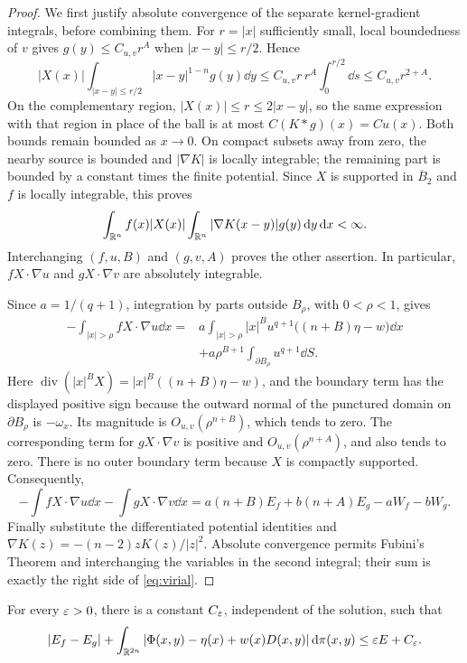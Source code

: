 \begin{proof}
We first justify absolute convergence of the separate kernel-gradient
integrals, before combining them. For \(r=|x|\) sufficiently small,
local boundedness of \(v\) gives
\(g(y)\le C_{u,v}r^A\) when \(|x-y|\le r/2\). Hence
\[
  |X(x)|\int_{|x-y|\le r/2}|x-y|^{1-n}g(y)\dd y
       \le C_{u,v}r\,r^A\int_0^{r/2}\dd s
       \le C_{u,v}r^{2+A}.
\]
On the complementary region, \(|X(x)|\le r\le2|x-y|\), so the same
expression with that region in place of the ball is at most
\(C(K*g)(x)=Cu(x)\). Both bounds remain bounded as \(x\to0\).
On compact subsets away from zero, the nearby source is bounded and
\(|\nabla K|\) is locally integrable; the remaining part is bounded
by a constant times the finite potential. Since \(X\) is supported
in \(\overline B_2\) and \(f\) is locally integrable, this proves
\[
  \int_{\mathbb R^n}f(x)|X(x)|
       \int_{\mathbb R^n}|\nabla K(x-y)|g(y)\,\mathrm d y\,\mathrm d x<\infty.
\]
Interchanging \((f,u,B)\) and \((g,v,A)\) proves the other assertion.
In particular, \(fX\cdot\nabla u\) and \(gX\cdot\nabla v\) are
absolutely integrable.

Since \(a=1/(q+1)\), integration by parts outside \(B_\rho\),
with \(0<\rho<1\), gives
\[
\begin{split}
  -\int_{|x|>\rho} fX\cdot\nabla u\dd x
   ={}&a\int_{|x|>\rho}|x|^B u^{q+1}
             \bigl((n+B)\eta-w\bigr)\dd x\\
     &+a\rho^{B+1}\int_{\partial B_\rho}u^{q+1}\dd S.
\end{split}
\]
Here
\(\operatorname{div}(|x|^BX)=|x|^B((n+B)\eta-w)\), and the
boundary term has the displayed positive sign because the outward normal
of the punctured domain on \(\partial B_\rho\) is \(-\omega_x\).
Its magnitude is \(O_{u,v}(\rho^{n+B})\), which tends to zero.
The corresponding term for \(gX\cdot\nabla v\) is positive and
\(O_{u,v}(\rho^{n+A})\), and also tends to zero. There is no outer
boundary term because \(X\) is compactly supported. Consequently,
\[
  -\int fX\cdot\nabla u\dd x-\int gX\cdot\nabla v\dd x
       =a(n+B)E_f+b(n+A)E_g-aW_f-bW_g.
\]
Finally substitute the differentiated potential identities and
\(\nabla K(z)=-(n-2)zK(z)/|z|^2\). Absolute convergence permits
Fubini's Theorem and interchanging the variables in the second integral;
their sum is exactly the right side of \eqref{eq:virial}.
\end{proof}

\begin{lemma}[Localization]\label{lem:localization}
For every \(\varepsilon>0\), there is a constant \(C_\varepsilon\), independent of
the solution, such that
\begin{equation}\label{eq:localization}
  |E_f-E_g|+
  \int_{\mathbb R^{2n}}|\Phi(x,y)-\eta(x)+w(x)D(x,y)|\,\mathrm d\pi(x,y)
       \le\varepsilon E+C_\varepsilon.
\end{equation}
\end{lemma}

